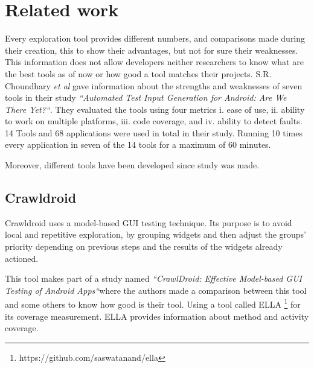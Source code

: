 
\chapter{Related work} %
\label{Chapter2} %


Every exploration tool provides different numbers, and comparisons made during their creation, this to show their advantages, but not for sure their weaknesses. This information does not allow developers neither researchers to know what are the best tools as of now or how good a tool matches their projects. 
S.R. Choundhary \textit{et al} \cite{Choudhary} gave information about the strengths and weaknesses of seven tools in their study \textit{``Automated Test Input Generation for Android: Are We There Yet?``}. They evaluated the tools using four metrics i. ease
of use, ii. ability to work on multiple platforms, iii. code coverage, and iv. ability to detect faults. 14 Tools and 68 applications were used in total in their study. Running 10 times every application in seven of the 14 tools for a maximum of 60 minutes.

Moreover, different tools have been developed since \cite{Choudhary} study was made.

\section{Crawldroid}\label{sec:crawldroid}

Crawldroid \cite{Cao} uses a model-based GUI testing technique. Its purpose is to avoid local and repetitive exploration, by grouping widgets and then adjust the groups' priority depending on previous steps and the results of the widgets already actioned. 

This tool makes part of a study named \textit{``CrawlDroid: Effective Model-based GUI Testing of Android Apps``}where the authors made a comparison between this tool and some others to know how good is their tool. Using a tool called ELLA \footnote{https://github.com/saswatanand/ella} for its coverage measurement. ELLA provides information about method and activity coverage.

